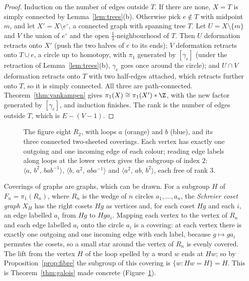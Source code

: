\begin{proof}
Induction on the number of edges outside $T$. If there are none, $X=T$ is simply connected by Lemma~\ref{lem:trees}(b). Otherwise pick $e\notin T$ with midpoint $m$, and let $X'=X\setminus e^\circ$, a
connected graph with spanning tree $T$. Let $U=X\setminus\{m\}$ and $V$ the union of $e^\circ$ and the open $\frac13$-neighbourhood of $T$. Then $U$ deformation retracts onto $X'$ (push the two
halves of $e$ to its ends); $V$ deformation retracts onto $T\cup e$, a circle up to homotopy, with $\pi_1$ generated by $[\gamma_e]$ (under the retraction of Lemma~\ref{lem:trees}(b), $\gamma_e$ goes once around the circle); and $U\cap V$ deformation retracts onto $T$ with two half-edges
attached, which retracts further onto $T$, so it is simply connected. All three are path-connected. Theorem~\ref{thm:vankampen} gives $\pi_1(X)\cong\pi_1(X')\ast\Z$, with the new factor generated
by $[\gamma_e]$, and induction finishes. The rank is the number of edges outside $T$, which is $E-(V-1)$.
\end{proof}

\begin{figure}[ht]
\centering
{}
\caption{The figure eight $R_2$, with loops $a$ (orange) and $b$ (blue), and its three connected two-sheeted coverings. Each vertex has exactly one outgoing and one incoming edge of each
colour; reading edge labels along loops at the lower vertex gives the subgroup of index $2$: $\langle a,\,b^2,\,bab^{-1}\rangle$, $\langle b,\,a^2,\,aba^{-1}\rangle$ and $\langle a^2,\,ab,\,b^2\rangle$, each free of rank $3$.}
\label{fig:coverings}
\end{figure}

Coverings of graphs are graphs, which can be drawn. For a subgroup $H$ of $F_n=\pi_1(R_n)$, where $R_n$ is the wedge of $n$ circles $a_1,\dots,a_n$, the \emph{Schreier coset graph} $X_H$ has the right
cosets $Hg$ as vertices and, for each coset $Hg$ and each $i$, an edge labelled $a_i$ from $Hg$ to $Hga_i$. Mapping each vertex to the vertex of $R_n$ and each edge labelled $a_i$ onto the circle
$a_i$ is a covering: at each vertex there is exactly one outgoing and one incoming edge with each label, because $g\mapsto ga_i$ permutes the cosets, so a small star around the vertex of $R_n$ is
evenly covered. The lift from the vertex $H$ of the loop spelled by a word $w$ ends at $Hw$; so by Proposition~\ref{prop:fibre} the subgroup of this covering is $\{w:Hw=H\}=H$. This is
Theorem~\ref{thm:galois} made concrete (Figure~\ref{fig:coverings}).

